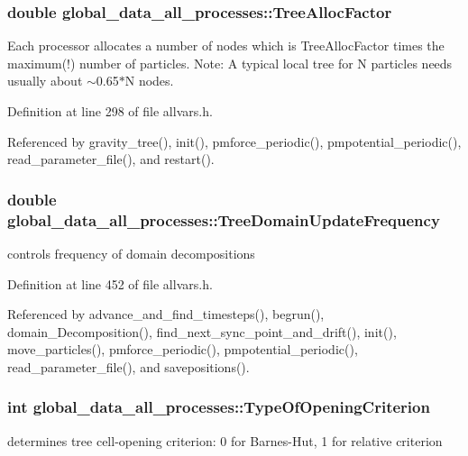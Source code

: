 \hypertarget{structglobal__data__all__processes_a374a92c40b930e388b7180b8862c3670}{
\subsubsection[{TreeAllocFactor}]{\setlength{\rightskip}{0pt plus 5cm}double {\bf global\_\-data\_\-all\_\-processes::TreeAllocFactor}}}
\label{structglobal__data__all__processes_a374a92c40b930e388b7180b8862c3670}
Each processor allocates a number of nodes which is TreeAllocFactor times the maximum(!) number of particles. Note: A typical local tree for N particles needs usually about $\sim$0.65$\ast$N nodes. 

Definition at line 298 of file allvars.h.



Referenced by gravity\_\-tree(), init(), pmforce\_\-periodic(), pmpotential\_\-periodic(), read\_\-parameter\_\-file(), and restart().

\hypertarget{structglobal__data__all__processes_a31f122fafb06e13f611ff905f514bfa9}{
\subsubsection[{TreeDomainUpdateFrequency}]{\setlength{\rightskip}{0pt plus 5cm}double {\bf global\_\-data\_\-all\_\-processes::TreeDomainUpdateFrequency}}}
\label{structglobal__data__all__processes_a31f122fafb06e13f611ff905f514bfa9}
controls frequency of domain decompositions 

Definition at line 452 of file allvars.h.



Referenced by advance\_\-and\_\-find\_\-timesteps(), begrun(), domain\_\-Decomposition(), find\_\-next\_\-sync\_\-point\_\-and\_\-drift(), init(), move\_\-particles(), pmforce\_\-periodic(), pmpotential\_\-periodic(), read\_\-parameter\_\-file(), and savepositions().

\hypertarget{structglobal__data__all__processes_a0c2a481de17eefbbd973fb8a7bb6f8fc}{
\subsubsection[{TypeOfOpeningCriterion}]{\setlength{\rightskip}{0pt plus 5cm}int {\bf global\_\-data\_\-all\_\-processes::TypeOfOpeningCriterion}}}
\label{structglobal__data__all__processes_a0c2a481de17eefbbd973fb8a7bb6f8fc}
determines tree cell-\/opening criterion: 0 for Barnes-\/Hut, 1 for relative criterion 

